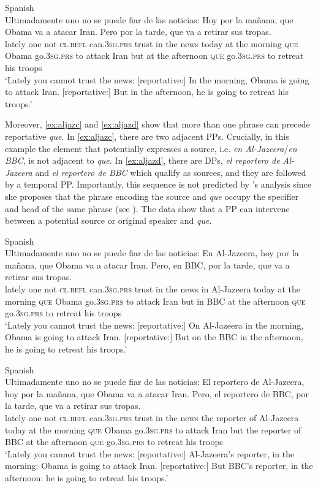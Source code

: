 \ea\label{ex:aljazb}
 Spanish\\ 
\gll  Ultimadamente uno no se puede fiar de las noticias: Hoy por la mañana, que Obama va a atacar Iran. Pero por la tarde, que va a retirar sus tropas. \\
lately one not \textsc{cl.refl} can.\textsc{3sg.prs} trust in the news  today at the morning \textsc{que} Obama go.\textsc{3sg.prs} to attack Iran but at the afternoon \textsc{que} go.\textsc{3sg.prs} to retreat his troops\\
\glt `Lately you cannot trust the news: [reportative:] In the morning, Obama is going to attack Iran. [reportative:] But in the afternoon, he is going to retreat his troops.'
\z

Moreover, \eqref{ex:aljazc} and \eqref{ex:aljazd} show that more than one phrase can precede reportative \emph{que}. In \eqref{ex:aljazc}, there are two adjacent PPs. Crucially, in this example the element that potentially expresses a source, i.e. \emph{en Al-Jazeera}\slash\emph{en BBC},  is not adjacent to \emph{que}. In \eqref{ex:aljazd}, there are DPs, \emph{el reportero de Al-Jazeera} and \emph{el reportero de BBC} which qualify as sources, and they are followed by a temporal PP. Importantly, this sequence is not predicted by  \citeauthor{Corr2016}'s analysis since she proposes that the phrase encoding the source and \emph{que} occupy the specifier and head of the same phrase (see \citealt[183]{Corr2016}). The data show  that a PP can intervene between a potential source or original speaker and \emph{que}.


\ea\label{ex:aljazc}
 Spanish\\ 
\gll Ultimadamente uno no se puede fiar de las noticias: En Al-Jazeera, hoy por la mañana, que Obama va a atacar Iran. Pero, en BBC, por la tarde, que va a retirar sus tropas. \\
lately one not \textsc{cl.refl} can.\textsc{3sg.prs} trust in the news in Al-Jazeera today at the morning \textsc{que} Obama go.\textsc{3sg.prs} to attack Iran but in BBC at the afternoon \textsc{que} go.\textsc{3sg.prs} to retreat his troops\\
\glt `Lately you cannot trust the news: [reportative:]  On Al-Jazeera in the morning, Obama is going to attack Iran. [reportative:] But  on the BBC in the afternoon, he is going to retreat his troops.'
 
\ex\label{ex:aljazd}
 Spanish\\ 
\gll Ultimadamente uno no se puede fiar de las noticias: El reportero de  Al-Jazeera, hoy por la mañana, que Obama va a atacar Iran. Pero, el reportero de  BBC, por la tarde, que va a retirar sus tropas. \\
lately one not \textsc{cl.refl} can.\textsc{3sg.prs} trust in the news the reporter of Al-Jazeera today at the morning \textsc{que} Obama go.\textsc{3sg.prs} to attack Iran but the reporter of BBC at the afternoon \textsc{que} go.\textsc{3sg.prs} to retreat his troops\\
\glt `Lately you cannot trust the news: [reportative:] Al-Jazeera's reporter, in the morning: Obama is going to attack Iran. [reportative:]  But BBC's reporter, in the afternoon: he is going to retreat his troops.'
\z 


